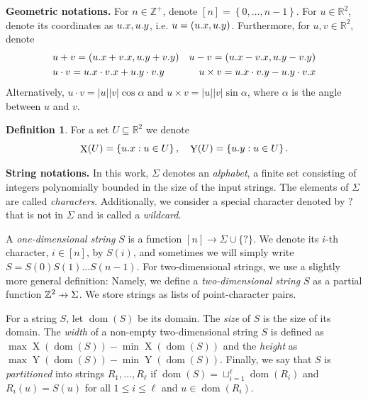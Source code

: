 \documentclass[11pt, letterpaper]{article}
\theoremstyle{plain}
\theoremstyle{definition}
\newtheorem{definition}{Definition}
\theoremstyle{remark}
\newcommand{\R}{\mathbb{R}}
\newcommand{\Z}{\mathbb{Z}}
\newcommand{\set}[1]{\left\lbrace #1 \right\rbrace}
\DeclareMathOperator*{\X}{X}
\DeclareMathOperator*{\Y}{Y}
\DeclareMathOperator*{\dom}{dom}
\DeclareMathOperator*{\chrome}{C}
\newcommand{\absolute}[1]{\left\lvert#1\right\rvert}
\begin{document}
\textbf{Geometric notations.} For $n \in \Z^+$, denote $[n] = \set{0, \dots, n - 1}$. For $u \in \R^2$, denote its coordinates as $u.x, u.y$, i.e. $u = (u.x, u.y)$. Furthermore, for $u, v \in \R^2$, denote 
\begin{align*}
&u + v = (u.x+v.x, u.y + v.y)  & u - v = (u.x-v.x, u.y-v.y)\\
&u \cdot v = u.x \cdot v.x + u.y \cdot v.y  & u \times v = u.x \cdot v.y - u.y \cdot v.x
\end{align*}
Alternatively, $u \cdot v = \absolute{u}\absolute{v} \cos \alpha$ and $u \times v = \absolute{u}\absolute{v} \sin \alpha$, where $\alpha$ is the angle between $u$ and $v$.

\begin{definition}
	For a set $U \subseteq \R^2$ we denote
	\[ \X(U) = \set{\x{u} : u \in U}, \quad \Y(U) = \set{\y{u} : u \in U}.\]
\end{definition}


\newcommand{\wild}{\texttt{?}}
\noindent \textbf{String notations.} In this work, $\Sigma$ denotes an \emph{alphabet}, a finite set consisting of integers polynomially bounded in the size of the input strings. The elements of $\Sigma$ are called \emph{characters}. Additionally, we consider a special character denoted by $\wild$ that is not in $\Sigma$ and is called a \emph{wildcard}.

\newcommand{\getchar}[1]{\chrome(#1)}
\newcommand{\pto}{\mathrel{\ooalign{\hfil$\mapstochar\mkern5mu$\hfil\cr$\to$\cr}}}
\renewcommand{\d}[1]{\dom(#1)}
\newcommand{\f}[1]{#1^\mathbf{f}}

A \emph{one-dimensional string} $S$ is a function $[n] \rightarrow \Sigma \cup \{\wild\}$. We denote its $i$-th character, $i \in [n]$, by $S(i)$, and sometimes we will simply write $S = S(0) S(1) \ldots S(n-1)$. For two-dimensional strings, we use a slightly more general definition: Namely, we define a \emph{two-dimensional string} $S$ as a partial function $\Z^2 \pto \Sigma$. We store strings as lists of point-character pairs. 

For a string $S$, let $\d{S}$ be its domain. The \emph{size} of $S$ is the size of its domain. The \emph{width} of a non-empty two-dimensional string $S$ is defined as $\max \X(\d{S}) - \min \X(\d{S})$ and the \emph{height} as $\max \Y(\d{S}) - \min \Y(\d{S})$. Finally, we say that $S$ is \emph{partitioned} into strings $R_1, \dots, R_\ell$ if $\d{S} = \sqcup_{i = 1}^\ell \d{R_i}$ and $R_i(u) = S(u)$ for all $1 \le i \le \ell$ and $u \in \d{R_i}$.
\end{document}
